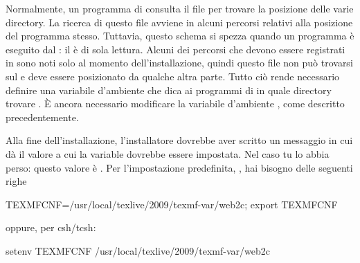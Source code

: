 \documentclass{article}
\begin{document}
Normalmente, un programma di \TL{} consulta il file 
per trovare la posizione delle varie directory. La ricerca di questo file
avviene in alcuni percorsi relativi alla posizione del programma stesso.
Tuttavia, questo schema si spezza quando un programma è eseguito dal
\DVD{}: il \DVD{} è di sola lettura. Alcuni dei percorsi che devono essere
registrati in  sono noti solo al momento
dell'installazione, quindi questo file non può trovarsi sul \DVD{} e deve
essere posizionato da qualche altra parte. Tutto ciò rende necessario
definire una variabile d'ambiente  che dica ai programmi
di \TL{} in quale directory trovare . È ancora
necessario modificare la variabile d'ambiente , come
descritto precedentemente.

Alla fine dell'installazione, l'installatore dovrebbe aver scritto un
messaggio in cui dà il valore a cui la variable 
dovrebbe essere impostata. Nel caso tu lo abbia perso: questo valore è
. Per l'impostazione predefinita,
, hai bisogno delle
seguenti righe
\begin{sverbatim}
TEXMFCNF=/usr/local/texlive/2009/texmf-var/web2c; export TEXMFCNF
\end{sverbatim}
oppure, per csh/tcsh:
\begin{sverbatim}
setenv TEXMFCNF /usr/local/texlive/2009/texmf-var/web2c
\end{sverbatim}
\end{document}

